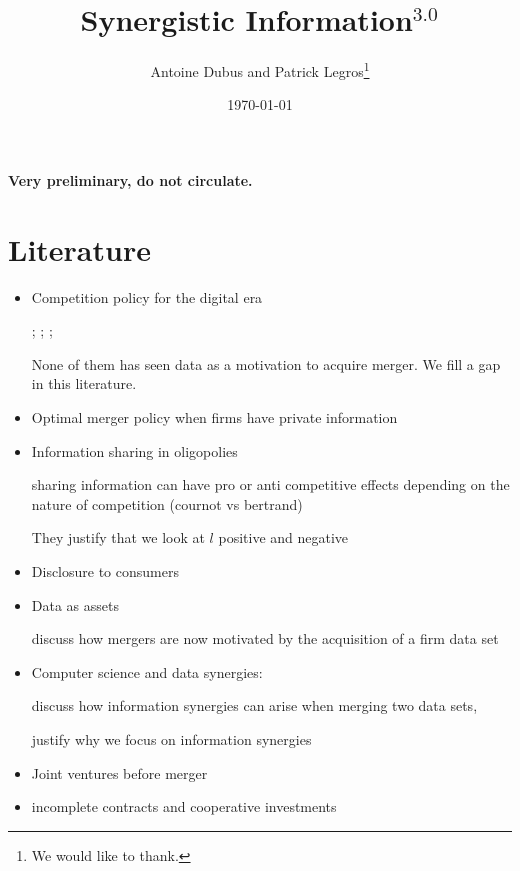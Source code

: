 \documentclass[a4paper]{article}
\begin{document}
\title{Synergistic Information$^{3.0}$}
\author{Antoine Dubus and Patrick Legros\thanks{We would like to thank.}}
\date{\today}


\maketitle

\begin{abstract}

\noindent 

\end{abstract}
 
\textbf{Very preliminary, do not circulate.}

\baselineskip0.7cm

\section{Literature}
\begin{itemize}\setlength\itemsep{-1em}
    \item Competition policy for the digital era
    
    \cite{tirole2020competition}; \cite{scott2019committee}; \cite{cremer2019competition}; \cite{cabral2020merger}
    
    None of them has seen data as a motivation to acquire merger. We fill a gap in this literature.
    
    \item Optimal merger policy when firms have private information \cite{Besanko1993}
    \item Information sharing in oligopolies
    
    \cite{vives1984duopoly, gal1986information} sharing information can have pro or anti competitive effects depending on the nature of competition (cournot vs bertrand)
    
    They justify that we look at $l$ positive and negative
    \item Disclosure to consumers 
    \item Data as assets
    
    \cite{stucke2016introduction} discuss how mergers are now motivated by the acquisition of a firm data set
    \item Computer science and data synergies:
    
    \cite{bertschinger2014quantifying, Griffith2014, olbrich2015information} discuss how information synergies can arise when merging two data sets, 
    
    justify why we focus on information synergies
    \item Joint ventures before merger
    \item incomplete contracts and cooperative investments \citep{Che1999}
\end{itemize}
\end{document}
